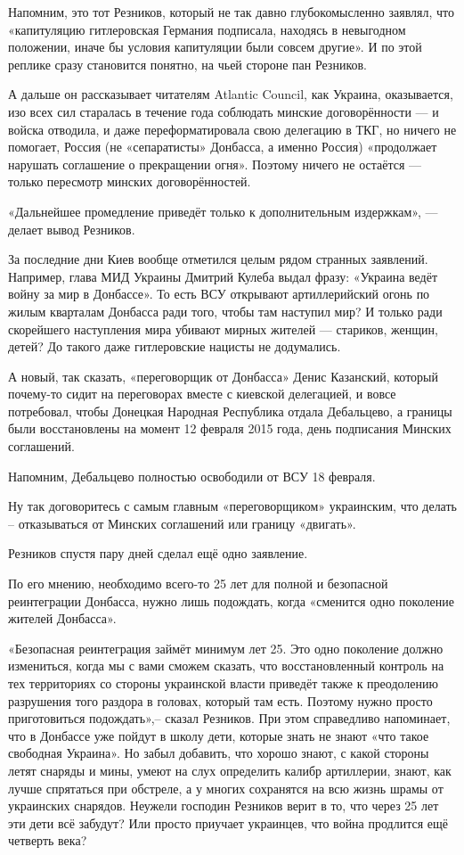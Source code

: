 Напомним, это тот Резников, который не так давно глубокомысленно заявлял, что
«капитуляцию гитлеровская Германия подписала, находясь в невыгодном положении,
иначе бы условия капитуляции были совсем другие». И по этой реплике сразу
становится понятно, на чьей стороне пан Резников.

А дальше он рассказывает читателям Atlantic Council, как Украина, оказывается,
изо всех сил старалась в течение года соблюдать минские договорённости --- и
войска отводила, и даже переформатировала свою делегацию в ТКГ, но ничего не
помогает, Россия (не «сепаратисты» Донбасса, а именно Россия) «продолжает
нарушать соглашение о прекращении огня». Поэтому ничего не остаётся --- только
пересмотр минских договорённостей.

«Дальнейшее промедление приведёт только к дополнительным издержкам», --- делает
вывод Резников.

За последние дни Киев вообще отметился целым рядом странных заявлений.
Например, глава МИД Украины Дмитрий Кулеба выдал фразу: «Украина ведёт войну за
мир в Донбассе». То есть ВСУ открывают артиллерийский огонь по жилым кварталам
Донбасса ради того, чтобы там наступил мир? И только ради скорейшего
наступления мира убивают мирных жителей --- стариков, женщин, детей? До такого
даже гитлеровские нацисты не додумались.

А новый, так сказать, «переговорщик от Донбасса» Денис Казанский, который
почему-то сидит на переговорах вместе с киевской делегацией, и вовсе
потребовал, чтобы Донецкая Народная Республика отдала Дебальцево, а границы
были восстановлены на момент 12 февраля 2015 года, день подписания Минских
соглашений.

Напомним, Дебальцево полностью освободили от ВСУ 18 февраля.

Ну так договоритесь с самым главным «переговорщиком» украинским, что делать –
отказываться от Минских соглашений или границу «двигать».

Резников спустя пару дней сделал ещё одно заявление.

По его мнению, необходимо всего-то 25 лет для полной и безопасной реинтеграции
Донбасса, нужно лишь подождать, когда «сменится одно поколение жителей
Донбасса».

«Безопасная реинтеграция займёт минимум лет 25. Это одно поколение должно
измениться, когда мы с вами сможем сказать, что восстановленный контроль на тех
территориях со стороны украинской власти приведёт также к преодолению
разрушения того раздора в головах, который там есть. Поэтому нужно просто
приготовиться подождать»,– сказал Резников. При этом справедливо напоминает,
что в Донбассе уже пойдут в школу дети, которые знать не знают «что такое
свободная Украина». Но забыл добавить, что хорошо знают, с какой стороны летят
снаряды и мины, умеют на слух определить калибр артиллерии, знают, как лучше
спрятаться при обстреле, а у многих сохранятся на всю жизнь шрамы от украинских
снарядов. Неужели господин Резников верит в то, что через 25 лет эти дети всё
забудут? Или просто приучает украинцев, что война продлится ещё четверть века?

